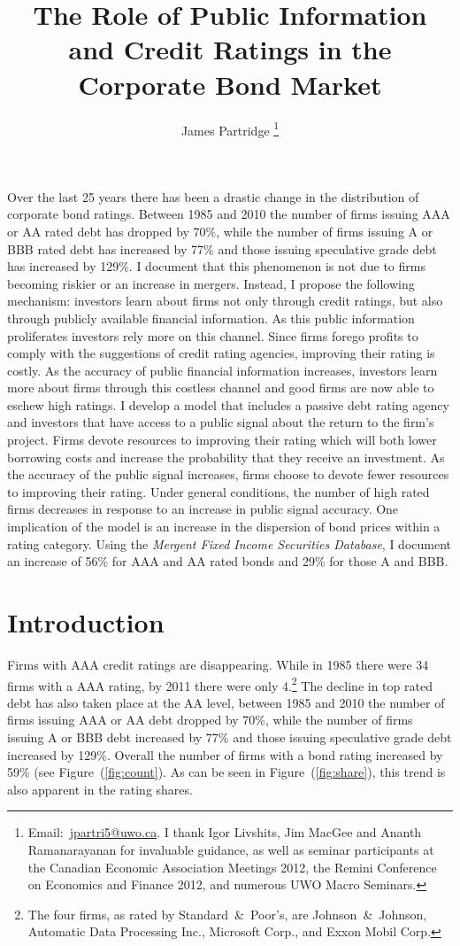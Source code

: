 \documentclass[notitlepage]{article}
\title{The Role of Public Information and Credit Ratings in the Corporate Bond Market}
\author{James Partridge%
\thanks{Email:~\href{mailto:jpartri5@uwo.ca}{jpartri5@uwo.ca}. I thank Igor Livshits, Jim MacGee and Ananth Ramanarayanan for invaluable guidance, as well as seminar participants at the Canadian Economic Association Meetings 2012, the Remini Conference on Economics and Finance 2012, and numerous UWO Macro Seminars.}}
\affil{The University of Western Ontario}
\date{}
\begin{document}
\maketitle
\vspace{-25pt}
\begin{onecolabstract}
Over the last 25 years there has been a drastic change in the distribution of corporate bond ratings. Between 1985 and 2010 the number of firms issuing AAA or AA rated debt has dropped by 70\%, while the number of firms issuing A or BBB rated debt has increased by 77\% and those issuing speculative grade debt has increased by 129\%. I document that this phenomenon is not due to firms becoming riskier or an increase in mergers. Instead, I propose the following mechanism: investors learn about firms not only through credit ratings, but also through publicly available financial information. As this public information proliferates investors rely more on this channel. Since firms forego profits to comply with the suggestions of credit rating agencies, improving their rating is costly. As the accuracy of public financial information increases, investors learn more about firms through this costless channel and good firms are now able to eschew high ratings. I develop a model that includes a passive debt rating agency and investors that have access to a public signal about the return to the firm's project. Firms devote resources to improving their rating which will both lower borrowing costs and increase the probability that they receive an investment.  As the accuracy of the public signal increases, firms choose to devote fewer resources to improving their rating. Under general conditions, the number of high rated firms decreases in response to an increase in public signal accuracy. One implication of the model is an increase in the dispersion of bond prices within a rating category. Using the \textit{Mergent Fixed Income Securities Database}, I document an increase of 56\% for AAA and AA rated bonds and 29\% for those A and BBB.
\end{onecolabstract}

\clearpage

\section{Introduction}
Firms with AAA credit ratings are disappearing. While in 1985 there were 34 firms with a AAA rating, by 2011 there were only 4.\footnote{The four firms, as rated by Standard~\&~Poor's, are Johnson~\&~Johnson, Automatic Data Processing Inc., Microsoft Corp., and Exxon Mobil Corp.} The decline in top rated debt has also taken place at the AA level, between 1985 and 2010 the number of firms issuing AAA or AA debt dropped by 70\%, while the number of firms issuing A or BBB debt increased by 77\% and those issuing speculative grade debt increased by 129\%. Overall the number of firms with a bond rating increased by 59\% (see Figure~(\ref{fig:count}). As can be seen in Figure~(\ref{fig:share}), this trend is also apparent in the rating shares.
\end{document}
